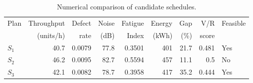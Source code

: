 \begin{table}[htbp]
\centering
\caption{Numerical comparison of candidate schedules.}
\label{tab:numerical-sim}
\small
\begin{tabular}{@{}lrrrrrrrl@{}}
\toprule
Plan & Throughput & Defect & Noise & Fatigue & Energy & Gap & V/R & Feasible \\
     & (units/h)  & rate   & (dB)  & Index   & (kWh)  & (\%) & score &         \\
\midrule
$S_{1}$ & 40.7 & 0.0079 & 77.8 & 0.3501 & 401 & 21.7 & 0.481 & Yes \\
$S_{2}$ & 46.2 & 0.0095 & 82.7 & 0.5594 & 457 & 11.1 & 0.5 & No \\
$S_{3}$ & 42.1 & 0.0082 & 78.7 & 0.3958 & 417 & 35.2 & 0.444 & Yes \\
\bottomrule
\end{tabular}
\end{table}
